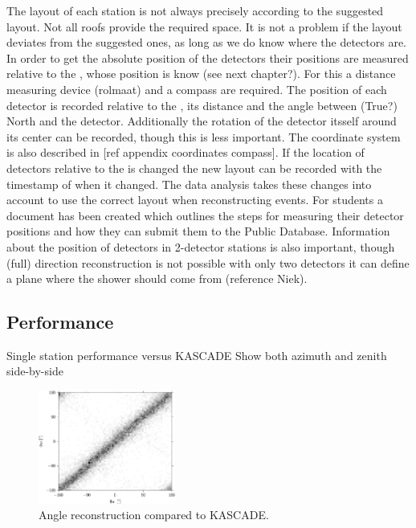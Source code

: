 The layout of each station is not always precisely according to the suggested layout. Not all roofs provide the required space. It is not a problem if the layout deviates from the suggested ones, as long as we do know where the detectors are. In order to get the absolute position of the detectors their positions are measured relative to the \gps, whose position is know (see next chapter?). For this a distance measuring device (rolmaat) and a compass are required. The position of each detector is recorded relative to the \gps, its distance and the angle between (True?) North and the detector. Additionally the rotation of the detector itsself around its center can be recorded, though this is less important. The coordinate system is also described in [ref appendix coordinates compass]. If the location of detectors relative to the \gps is changed the new layout can be recorded with the timestamp of when it changed. The data analysis takes these changes into account to use the correct layout when reconstructing events. For students a document has been created which outlines the steps for measuring their detector positions and how they can submit them to the Public Database. Information about the position of detectors in 2-detector stations is also important, though (full) direction reconstruction is not possible with only two detectors it can define a plane where the shower should come from (reference Niek).


\subsection{Performance}

Single station performance versus KASCADE
Show both azimuth and zenith side-by-side

\begin{figure}
    \centering
    \includegraphics[width=0.4\textwidth]
                    {plots/experiment/azimuth_kascade_minn1}
    \caption{Angle reconstruction compared to KASCADE.}
    \label{fig:azimuth_kascade}
\end{figure}


